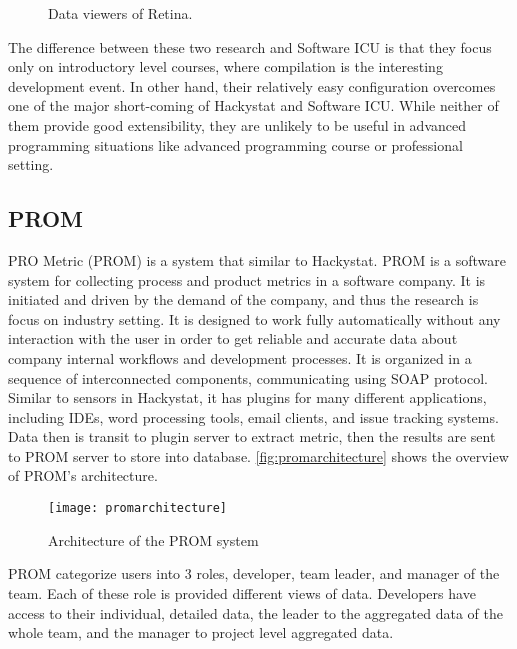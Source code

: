 \begin{figure}[htbp]
     \centering
          
     \caption{Data viewers of Retina.}
     \label{fig:retina}
\end{figure}

The difference between these two research and Software ICU is that they focus only on introductory level courses, where compilation is the interesting development event. In other hand, their relatively easy configuration overcomes one of the major short-coming of Hackystat and Software ICU. While neither of them provide good extensibility, they are unlikely to be useful in advanced programming situations like advanced programming course or professional setting.

\subsection {PROM}
PRO Metric (PROM) \cite{prom03} is a system that similar to Hackystat. PROM is a software system for collecting process and product metrics in a software company. It is initiated and driven by the demand of the company, and thus the research is focus on industry setting. It is designed to work fully automatically without any interaction with the user in order to get reliable and accurate data about company internal workflows and development processes. It is organized in a sequence of interconnected components, communicating using SOAP protocol. Similar to sensors in Hackystat, it has plugins for many different applications, including IDEs, word processing tools, email clients, and issue tracking systems. Data then is transit to plugin server to extract metric, then the results are sent to PROM server to store into database. \autoref{fig:promarchitecture} shows the overview of PROM's architecture.

\begin{figure}[htbp]
     \centering
     \texttt{[image: promarchitecture]}
     \caption{Architecture of the PROM system}
     \label{fig:promarchitecture}
\end{figure}

PROM categorize users into 3 roles, developer, team leader, and manager of the team. Each of these role is provided different views of data. Developers have access to their individual, detailed data, the leader to the aggregated data of the whole team, and the manager to project level aggregated data.

